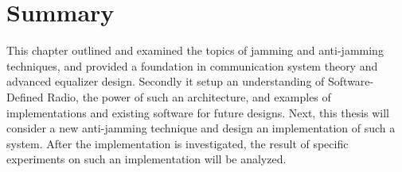 \section{Summary}

This chapter outlined and examined the topics of jamming and anti-jamming techniques, and provided a foundation in communication system theory and advanced equalizer design.  Secondly it setup an understanding of Software-Defined Radio, the power of such an architecture, and examples of implementations and existing software for future designs.  Next, this thesis will consider a new anti-jamming technique and design an implementation of such a system.  After the implementation is investigated, the result of specific experiments on such an implementation will be analyzed.\\
